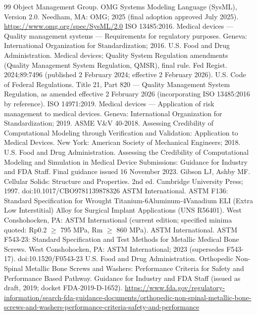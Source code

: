 \documentclass[10pt,twocolumn,letterpaper]{article}
\begin{document}
\begin{thebibliography}{99}
 Object Management Group. OMG Systems Modeling Language (SysML), Version 2.0. Needham, MA: OMG; 2025 (final adoption approved July 2025). \url{https://www.omg.org/spec/SysML/2.0}
 ISO 13485:2016. Medical devices --- Quality management systems --- Requirements for regulatory purposes. Geneva: International Organization for Standardization; 2016.
 U.S. Food and Drug Administration. Medical devices; Quality System Regulation amendments (Quality Management System Regulation, QMSR), final rule. Fed Regist. 2024;89:7496 (published 2 February 2024; effective 2 February 2026).
 U.S. Code of Federal Regulations. Title 21, Part 820 --- Quality Management System Regulation, as amended effective 2 February 2026 (incorporating ISO 13485:2016 by reference).
 ISO 14971:2019. Medical devices --- Application of risk management to medical devices. Geneva: International Organization for Standardization; 2019.
 ASME V\&V 40-2018. Assessing Credibility of Computational Modeling through Verification and Validation: Application to Medical Devices. New York: American Society of Mechanical Engineers; 2018.
 U.S. Food and Drug Administration. Assessing the Credibility of Computational Modeling and Simulation in Medical Device Submissions: Guidance for Industry and FDA Staff. Final guidance issued 16 November 2023.
 Gibson LJ, Ashby MF. Cellular Solids: Structure and Properties. 2nd ed. Cambridge University Press; 1997. doi:10.1017/CBO9781139878326
 ASTM International. ASTM F136: Standard Specification for Wrought Titanium-6Aluminum-4Vanadium ELI (Extra Low Interstitial) Alloy for Surgical Implant Applications (UNS R56401). West Conshohocken, PA: ASTM International (current edition; specified minima quoted: Rp0.2 $\geq$ 795 MPa, Rm $\geq$ 860 MPa).
 ASTM International. ASTM F543-23: Standard Specification and Test Methods for Metallic Medical Bone Screws. West Conshohocken, PA: ASTM International; 2023 (supersedes F543-17). doi:10.1520/F0543-23
 U.S. Food and Drug Administration. Orthopedic Non-Spinal Metallic Bone Screws and Washers: Performance Criteria for Safety and Performance Based Pathway. Guidance for Industry and FDA Staff (issued as draft, 2019; docket FDA-2019-D-1652). \url{https://www.fda.gov/regulatory-information/search-fda-guidance-documents/orthopedic-non-spinal-metallic-bone-screws-and-washers-performance-criteria-safety-and-performance}
\end{thebibliography}
\endgroup
\end{document}
